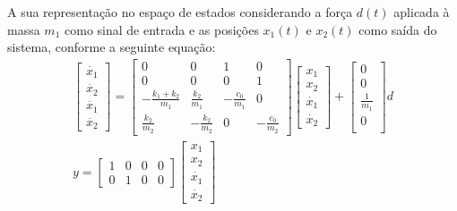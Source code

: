 A sua representação no espaço de estados considerando a força $d(t)$ aplicada à massa $m_1$ como sinal de entrada e as posições $x_1(t)$ e $x_2(t)$ como saída do sistema, conforme a seguinte equação: \begin{gather}
  \begin{bmatrix}
    \dot{x_1} \\ \dot{x_2} \\ \ddot{x_1} \\ \ddot{x_2}
  \end{bmatrix}
  =
  \begin{bmatrix}
    0                                   & 0                             & 1                             & 0                             \\
    0                                   & 0                             & 0                             & 1                             \\
    \displaystyle-\frac{k_1 + k_2}{m_1} & \displaystyle\frac{k_2}{m_1}  & \displaystyle-\frac{c_0}{m_1} & 0                             \\
    \displaystyle\frac{k_2}{m_2}        & \displaystyle-\frac{k_2}{m_2} & 0                             & \displaystyle-\frac{c_0}{m_2}
  \end{bmatrix}
  \begin{bmatrix}
    x_1 \\ x_2 \\ \dot{x_1} \\ \dot{x_2}
  \end{bmatrix}
  +
  \begin{bmatrix}
    0                           \\
    0                           \\
    \displaystyle \frac{1}{m_1} \\
    0                           \\
  \end{bmatrix}
  d \\[12pt]
  y =
  \begin{bmatrix}
    1 & 0 & 0 & 0 \\
    0 & 1 & 0 & 0
  \end{bmatrix}
  \begin{bmatrix}
    x_1 \\ x_2 \\ \dot{x_1} \\ \dot{x_2}
  \end{bmatrix}
\end{gather}

